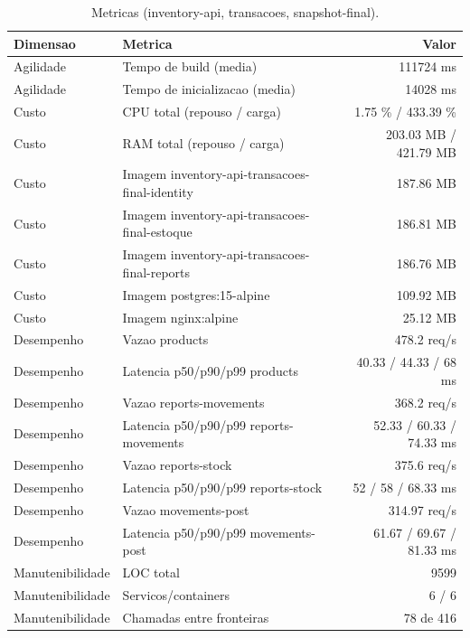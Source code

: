 \begin{table}[htb]
  \centering
  \caption{Metricas (inventory-api, transacoes, snapshot-final).}
  \label{tab:metricas-inventory-api-transacoes-snapshot-final}
  \begin{tabular}{llr}
    \hline
    \textbf{Dimensao} & \textbf{Metrica} & \textbf{Valor} \\
    \hline
    Agilidade & Tempo de build (media) & 111724 ms \\
    Agilidade & Tempo de inicializacao (media) & 14028 ms \\
    Custo & CPU total (repouso / carga) & 1.75 \% / 433.39 \% \\
    Custo & RAM total (repouso / carga) & 203.03 MB / 421.79 MB \\
    Custo & Imagem inventory-api-transacoes-final-identity & 187.86 MB \\
    Custo & Imagem inventory-api-transacoes-final-estoque & 186.81 MB \\
    Custo & Imagem inventory-api-transacoes-final-reports & 186.76 MB \\
    Custo & Imagem postgres:15-alpine & 109.92 MB \\
    Custo & Imagem nginx:alpine & 25.12 MB \\
    Desempenho & Vazao products & 478.2 req/s \\
    Desempenho & Latencia p50/p90/p99 products & 40.33 / 44.33 / 68 ms \\
    Desempenho & Vazao reports-movements & 368.2 req/s \\
    Desempenho & Latencia p50/p90/p99 reports-movements & 52.33 / 60.33 / 74.33 ms \\
    Desempenho & Vazao reports-stock & 375.6 req/s \\
    Desempenho & Latencia p50/p90/p99 reports-stock & 52 / 58 / 68.33 ms \\
    Desempenho & Vazao movements-post & 314.97 req/s \\
    Desempenho & Latencia p50/p90/p99 movements-post & 61.67 / 69.67 / 81.33 ms \\
    Manutenibilidade & LOC total & 9599 \\
    Manutenibilidade & Servicos/containers & 6 / 6 \\
    Manutenibilidade & Chamadas entre fronteiras & 78 de 416 \\
    \hline
  \end{tabular}
\end{table}
